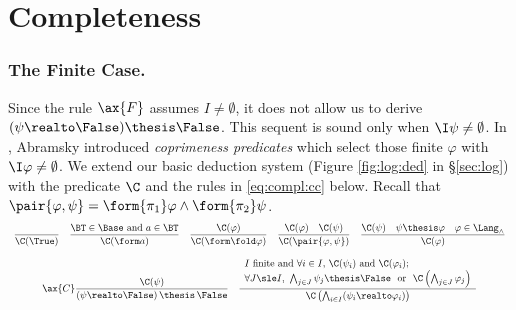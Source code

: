 \section{Completeness}
\label{sec:compl}




\subsubsection{The Finite Case.}
\label{sec:compl:fin}
Since the rule $\ax{F}$ assumes $I\neq \emptyset$,
it does not allow us to derive 
$(\psi \realto \False) \thesis \False$.
This sequent is sound only when $\I\psi \neq \emptyset$.
In \cite{abramsky91apal},
Abramsky introduced \emph{coprimeness predicates} %
which select those finite $\varphi$ with $\I\varphi \neq \emptyset$.
We extend our basic deduction system (Figure \ref{fig:log:ded} in \S\ref{sec:log})
with the predicate $\C$ and the rules in \eqref{eq:compl:cc} below.
Recall that $\pair{\varphi,\psi} = \form{\pi_1}\varphi \land \form{\pi_2}\psi$.
\begin{equation}
\label{eq:compl:cc}
\scalebox{.9125}{\text{$\begin{array}{c}

\dfrac{}{\C(\True)}

\quad

\dfrac
  {\text{$\BT \in \Base$ and $a \in \BT$}}
  {\C(\form a)}

\quad

\dfrac{\C(\varphi)}
  {\C(\form\fold \varphi)}

\quad

\dfrac{\C(\varphi) 
  \quad
  \C(\psi)}
  {\C(\pair{\varphi,\psi})}

\quad

\dfrac{\C(\psi)
  \quad
  \psi \thesis \varphi
  \quad
  \varphi \in \Lang_\land}
  {\C(\varphi)}
\\\\

\ax{C}
\dfrac{\C(\psi)}
  {(\psi \realto \False) \,\thesis\, \False}

\quad

\dfrac{\begin{array}{l}
  \text{$I$ finite and $\forall i \in I$,}~
  \C(\psi_i) 
  ~\text{and}~
  \C(\varphi_i) ;
  \\
  \text{$\forall J \sle I$,}~
  \bigwedge_{j \in J} \psi_j \thesis \False
  ~~\text{or}~~
  \C\left( \bigwedge_{j \in J} \varphi_j \right)
  \end{array}}
  {\C\left( \bigwedge_{i \in I}(\psi_i \realto \varphi_i) \right)}
\end{array}$}}
\end{equation}


